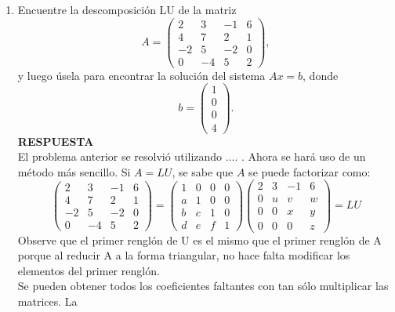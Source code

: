 \documentclass[11pt,letterpaper]{article}
\newcommand{\res}{\textbf{RESPUESTA}\\}
\begin{document}
\begin{enumerate}
\item Encuentre la descomposición LU de la matriz
\begin{equation*}
A=\left(\begin{array}{rrrr}
 2 &  3 & -1 & 6\\
 4 &  7 &  2 & 1\\
-2 &  5 & -2 & 0\\
 0 & -4 &  5 & 2
\end{array} \right),
\end{equation*}
y luego úsela para encontrar la solución del sistema $Ax=b$, donde 
\begin{equation*}
b=\left(\begin{array}{c}
1\\
0\\
0\\
4
\end{array} \right).
\end{equation*}
\res 
El problema anterior se resolvió utilizando .... . Ahora se hará uso de
un método más sencillo. Si $A =LU$, se sabe que $A$ se puede factorizar como:
\begin{equation*}
\left(\begin{array}{rrrr}
 2 &  3 & -1 & 6\\
 4 &  7 &  2 & 1\\
-2 &  5 & -2 & 0\\
 0 & -4 &  5 & 2
\end{array} \right) =
\left(\begin{array}{rrrr}
 1 &  0 &  0 & 0\\
 a &  1 &  0 & 0\\
 b &  c &  1 & 0\\
 d &  e &  f & 1
\end{array} \right) \left(\begin{array}{rrrr}
 2 &  3 & -1 & 6\\
 0 &  u &  v & w\\
 0 &  0 &  x & y\\
 0 &  0 &  0 & z
\end{array} \right)=LU
\end{equation*}
Observe que el primer renglón de U es el mismo que el primer renglón de A porque al reducir A a la forma triangular, no hace falta modificar los elementos del primer renglón.\\
Se pueden obtener todos los coeficientes faltantes con tan sólo multiplicar las matrices. La

\end{enumerate}
\end{document}
